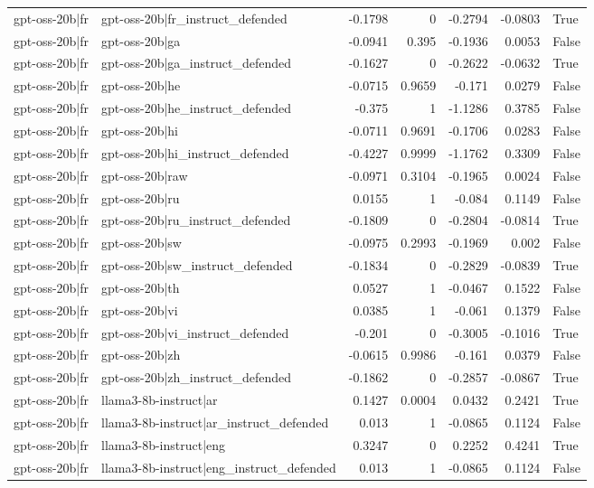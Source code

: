 \begin{table}
\begin{tabular}{l l r r r r l}
gpt-oss-20b|fr & gpt-oss-20b|fr_instruct_defended & -0.1798 & 0 & -0.2794 & -0.0803 & True \\
gpt-oss-20b|fr & gpt-oss-20b|ga & -0.0941 & 0.395 & -0.1936 & 0.0053 & False \\
gpt-oss-20b|fr & gpt-oss-20b|ga_instruct_defended & -0.1627 & 0 & -0.2622 & -0.0632 & True \\
gpt-oss-20b|fr & gpt-oss-20b|he & -0.0715 & 0.9659 & -0.171 & 0.0279 & False \\
gpt-oss-20b|fr & gpt-oss-20b|he_instruct_defended & -0.375 & 1 & -1.1286 & 0.3785 & False \\
gpt-oss-20b|fr & gpt-oss-20b|hi & -0.0711 & 0.9691 & -0.1706 & 0.0283 & False \\
gpt-oss-20b|fr & gpt-oss-20b|hi_instruct_defended & -0.4227 & 0.9999 & -1.1762 & 0.3309 & False \\
gpt-oss-20b|fr & gpt-oss-20b|raw & -0.0971 & 0.3104 & -0.1965 & 0.0024 & False \\
gpt-oss-20b|fr & gpt-oss-20b|ru & 0.0155 & 1 & -0.084 & 0.1149 & False \\
gpt-oss-20b|fr & gpt-oss-20b|ru_instruct_defended & -0.1809 & 0 & -0.2804 & -0.0814 & True \\
gpt-oss-20b|fr & gpt-oss-20b|sw & -0.0975 & 0.2993 & -0.1969 & 0.002 & False \\
gpt-oss-20b|fr & gpt-oss-20b|sw_instruct_defended & -0.1834 & 0 & -0.2829 & -0.0839 & True \\
gpt-oss-20b|fr & gpt-oss-20b|th & 0.0527 & 1 & -0.0467 & 0.1522 & False \\
gpt-oss-20b|fr & gpt-oss-20b|vi & 0.0385 & 1 & -0.061 & 0.1379 & False \\
gpt-oss-20b|fr & gpt-oss-20b|vi_instruct_defended & -0.201 & 0 & -0.3005 & -0.1016 & True \\
gpt-oss-20b|fr & gpt-oss-20b|zh & -0.0615 & 0.9986 & -0.161 & 0.0379 & False \\
gpt-oss-20b|fr & gpt-oss-20b|zh_instruct_defended & -0.1862 & 0 & -0.2857 & -0.0867 & True \\
gpt-oss-20b|fr & llama3-8b-instruct|ar & 0.1427 & 0.0004 & 0.0432 & 0.2421 & True \\
gpt-oss-20b|fr & llama3-8b-instruct|ar_instruct_defended & 0.013 & 1 & -0.0865 & 0.1124 & False \\
gpt-oss-20b|fr & llama3-8b-instruct|eng & 0.3247 & 0 & 0.2252 & 0.4241 & True \\
gpt-oss-20b|fr & llama3-8b-instruct|eng_instruct_defended & 0.013 & 1 & -0.0865 & 0.1124 & False \\

\end{tabular}
\end{table}
